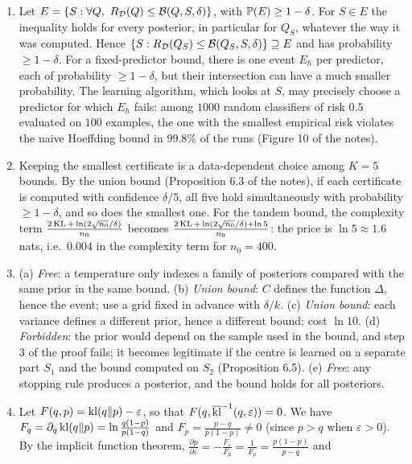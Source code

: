 \documentclass[11pt]{article}
\begin{document}
\begin{solution}
\begin{enumerate}
\item Let $E=\{S:\forall Q,\ \RD(Q)\leq\mathcal B(Q,S,\delta)\}$, with $\P(E)\geq1-\delta$. For $S\in E$ the inequality holds for
      every posterior, in particular for $Q_S$, whatever the way it was computed. Hence
      $\{S:\RD(Q_S)\leq\mathcal B(Q_S,S,\delta)\}\supseteq E$ and has probability $\geq1-\delta$. For a fixed-predictor bound,
      there is one event $E_h$ per predictor, each of probability $\geq1-\delta$, but their intersection can have a much
      smaller probability. The learning algorithm, which looks at $S$, may precisely choose a predictor for which
      $E_h$ fails: among $1000$ random classifiers of risk $0.5$ evaluated on $100$ examples, the one with the smallest
      empirical risk violates the naive Hoeffding bound in $99.8\%$ of the runs (Figure 10 of the notes).
\item Keeping the smallest certificate is a data-dependent choice among $K=5$ bounds. By the union bound
      (Proposition 6.3 of the notes), if each certificate is computed with confidence $\delta/5$, all five hold
      simultaneously with probability $\geq1-\delta$, and so does the smallest one. For the tandem bound, the complexity
      term $\frac{2\KL+\ln(2\sqrt{n_0}/\delta)}{n_0}$ becomes $\frac{2\KL+\ln(2\sqrt{n_0}/\delta)+\ln5}{n_0}$: the price is
      $\ln5\approx1.6$ nats, i.e.\ $0.004$ in the complexity term for $n_0=400$.
\item (a) \emph{Free}: a temperature only indexes a family of posteriors compared with the same prior in the same
      bound. (b) \emph{Union bound}: $C$ defines the function $\Delta$, hence the event; use a grid fixed in advance with
      $\delta/k$. (c) \emph{Union bound}: each variance defines a different prior, hence a different bound; cost $\ln10$.
      (d) \emph{Forbidden}: the prior would depend on the sample used in the bound, and step 3 of the proof fails; it
      becomes legitimate if the centre is learned on a separate part $S_1$ and the bound computed on $S_2$
      (Proposition 6.5). (e) \emph{Free}: any stopping rule produces a posterior, and the bound holds for all posteriors.
\item Let $F(q,p)=\kl(q\|p)-\varepsilon$, so that $F(q,\klup(q,\varepsilon))=0$. We have $F_q=\partial_q\kl(q\|p)=\ln\frac{q(1-p)}{p(1-q)}$
      and $F_p=\frac{p-q}{p(1-p)}\neq0$ (since $p>q$ when $\varepsilon>0$). By the implicit function theorem,
      $\frac{\partial p}{\partial\varepsilon}=-\frac{F_\varepsilon}{F_p}=\frac1{F_p}=\frac{p(1-p)}{p-q}$ and

\end{enumerate}
\end{solution}
\end{document}
